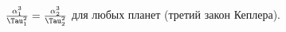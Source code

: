 $\tfrac{\alpha^3_1}{\Tau^2_1}=\tfrac{\alpha^3_2}{\Tau^2_2}$ для любых планет (третий закон Кеплера).
